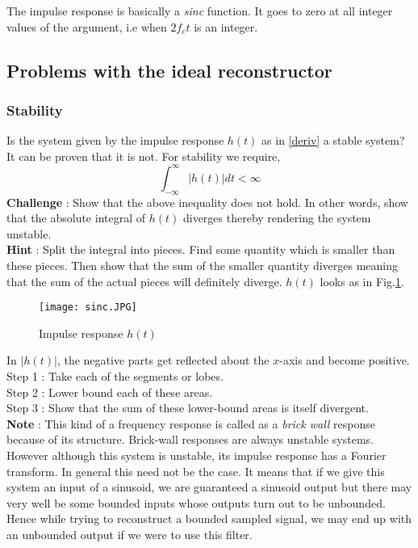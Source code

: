 The impulse response is basically a \textit{sinc} function. It goes to zero at all integer values of the argument, i.e when $2f_{c}t$ is an integer. 

\subsection{Problems with the ideal reconstructor}
\subsubsection{Stability}
Is the system given by the impulse response $h(t)$ as in \eqref{deriv} a stable system? It can be proven that it is not. For stability we require,
\begin{equation} \label{unstable}
\int_{-\infty}^{\infty} |h(t)|dt < \infty
\end{equation}
\textbf{Challenge} : Show that the above inequality does not hold. In other words, show that the absolute integral of $h(t)$ diverges thereby rendering the system unstable. \\
\textbf{Hint} : Split the integral into pieces. Find some quantity which is smaller than these pieces. Then show that the sum of the smaller quantity diverges meaning that the sum of the actual pieces will definitely diverge. $h(t)$ looks as in Fig.\ref{sinc}.
\begin{figure}[h] 
        \centering
        
                \texttt{[image: sinc.JPG]}
                \caption{Impulse response $h(t)$}
                \label{sinc}
        
\end{figure}

In $|h(t)|$, the negative parts get reflected about the $x$-axis and become positive. \\
Step 1 : Take each of the segments or lobes. \\
Step 2 : Lower bound each of these areas. \\
Step 3 : Show that the sum of these lower-bound areas is itself divergent.\\

\textbf{Note} :  This kind of a frequency response is called as a \textit{brick wall} response because of its structure. Brick-wall responses are always unstable systems. However although this system is unstable, its impulse response has a Fourier transform. In general this need not be the case. It means that if we give this system an input of a sinusoid, we are guaranteed a sinusoid output but there may very well be some bounded inputs whose outputs turn out to be unbounded. Hence while trying to reconstruct a bounded sampled signal, we may end up with an unbounded output if we were to use this filter. \\

